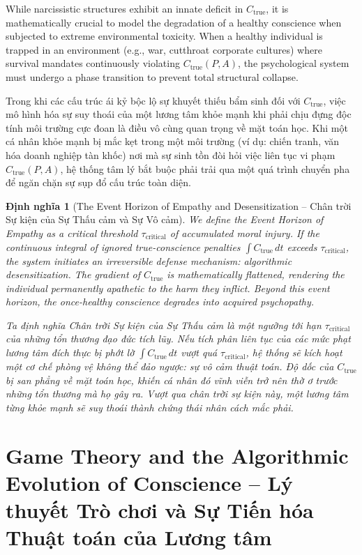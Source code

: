 \documentclass{report}
\newtheorem{dinhnghia}{Định nghĩa}
\begin{document}
While narcissistic structures exhibit an innate deficit in $C_{\text{true}}$, it is mathematically crucial to model the degradation of a healthy conscience when subjected to extreme environmental toxicity. When a healthy individual is trapped in an environment (e.g., war, cutthroat corporate cultures) where survival mandates continuously violating $C_{\text{true}}(P,A)$, the psychological system must undergo a phase transition to prevent total structural collapse.

Trong khi các cấu trúc ái kỷ bộc lộ sự khuyết thiếu bẩm sinh đối với $C_{\text{true}}$, việc mô hình hóa sự suy thoái của một lương tâm khỏe mạnh khi phải chịu đựng độc tính môi trường cực đoan là điều vô cùng quan trọng về mặt toán học. Khi một cá nhân khỏe mạnh bị mắc kẹt trong một môi trường (ví dụ: chiến tranh, văn hóa doanh nghiệp tàn khốc) nơi mà sự sinh tồn đòi hỏi việc liên tục vi phạm $C_{\text{true}}(P,A)$, hệ thống tâm lý bắt buộc phải trải qua một quá trình chuyển pha để ngăn chặn sự sụp đổ cấu trúc toàn diện.

\begin{dinhnghia}[The Event Horizon of Empathy and Desensitization -- Chân trời Sự kiện của Sự Thấu cảm và Sự Vô cảm]
	We define the Event Horizon of Empathy as a critical threshold $\tau_{\text{critical}}$ of accumulated moral injury. If the continuous integral of ignored true-conscience penalties $\int C_{\text{true}} \, dt$ exceeds $\tau_{\text{critical}}$, the system initiates an irreversible defense mechanism: algorithmic desensitization. The gradient of $C_{\text{true}}$ is mathematically flattened, rendering the individual permanently apathetic to the harm they inflict. Beyond this event horizon, the once-healthy conscience degrades into acquired psychopathy.
	
	Ta định nghĩa Chân trời Sự kiện của Sự Thấu cảm là một ngưỡng tới hạn $\tau_{\text{critical}}$ của những tổn thương đạo đức tích lũy. Nếu tích phân liên tục của các mức phạt lương tâm đích thực bị phớt lờ $\int C_{\text{true}} \, dt$ vượt quá $\tau_{\text{critical}}$, hệ thống sẽ kích hoạt một cơ chế phòng vệ không thể đảo ngược: sự vô cảm thuật toán. Độ dốc của $C_{\text{true}}$ bị san phẳng về mặt toán học, khiến cá nhân đó vĩnh viễn trở nên thờ ơ trước những tổn thương mà họ gây ra. Vượt qua chân trời sự kiện này, một lương tâm từng khỏe mạnh sẽ suy thoái thành chứng thái nhân cách mắc phải.
\end{dinhnghia}

\section{Game Theory and the Algorithmic Evolution of Conscience -- Lý thuyết Trò chơi và Sự Tiến hóa Thuật toán của Lương tâm}
\end{document}
